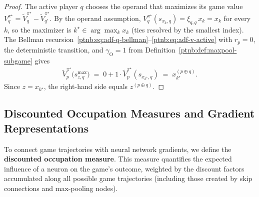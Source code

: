 \begin{proof}
The active player $q$ chooses the operand that maximizes its game value $V_q^{\pi^\star} = \tilde
    V_q^{\pi^\star} - \tilde V_{q'}^{\pi^\star}$. By the operand assumption,
$V_q^{\pi^\star}(s_{x_k,q}) = \xi_{q,q}\, x_k = x_k$ for every $k$, so the maximizer is $k^\star
    \in \arg\max_k x_k$ (ties resolved by the smallest index). The Bellman
recursion~\eqref{ptnb:eq:adf-q-bellman}--\eqref{ptnb:eq:adf-v-active} with $r_p = 0$, the deterministic
transition, and $\gamma_{\mathrm{O}} = 1$ from Definition~\ref{ptnb:def:maxpool-subgame} gives
\begin{align}
    \tilde V_p^{\pi^\star}\bigl(s_{z,q}^{\max}\bigr) \;=\; 0 + 1 \cdot \tilde
    V_p^{\pi^\star}(s_{x_{k^\star},q}) \;=\; x_{k^\star}^{(p\oplus q)}.
\end{align}
Since $z = x_{k^\star}$, the right-hand side equals $z^{(p\oplus q)}$.
\end{proof}

\subsection{Discounted Occupation Measures and Gradient Representations}\label{ptnb:app:occ-deriv}\label{subsec:gradient_occupation}

To connect game trajectories with neural network gradients, we define the \textbf{discounted
occupation measure}. This measure quantifies the expected influence of a neuron on the game's
outcome, weighted by the discount factors accumulated along all possible game trajectories
(including those created by skip connections and max-pooling nodes).

